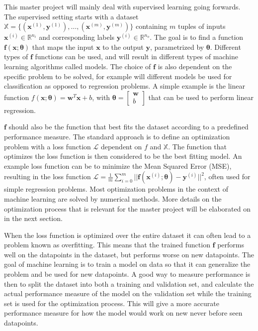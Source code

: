 \documentclass[12pt,a4paper]{book}
\begin{document}
This master project will mainly deal with supervised learning going forwards. The supervised setting starts with a dataset $\mathbb{X} = \{ (\bm{x}^{(1)}, \bm{y}^{(1)}), \dots, (\bm{x}^{(m)}, \bm{y}^{(m)}) \}$ containing $m$ tuples of inputs $\bm{x}^{(i)} \in \mathbb{R}^{n_i}$ and corresponding labels $\bm{y}^{(i)} \in \mathbb{R}^{n_o}$. The goal is to find a function $\bm{f}(\bm{x}; \bm{\theta})$ that maps the input $\bm{x}$ to the output $\bm{y}$, parametrized by $\bm{\theta}$. Different types of $\bm{f}$ functions can be used, and will result in different types of machine learning algorithms called models. The choice of $\bm{f}$ is also dependent on the specific problem to be solved, for example will different models be used for classification as opposed to regression problems. A simple example is the linear function $f(\bm{x}; \bm{\theta}) = \bm{w}^T \bm{x} + b$, with $\bm{\theta} = \begin{bmatrix}\bm{w} \\ b \end{bmatrix}$ that can be used to perform linear regression.

$\bm{f}$ should also be the function that best fits the dataset according to a predefined performance measure. The standard approach is to define an optimization problem with a loss function $\mathcal{L}$ dependent on $f$ and $\mathbb{X}$. The function that optimizes the loss function is then considered to be the best fitting model. An example loss function can be to minimize the Mean Squared Error (MSE), resulting in the loss function $\mathcal{L} = \frac{1}{m} \sum_{i=0}^{m} ||\bm{f}(\bm{x}^{(i)}; \bm{\theta}) - \bm{y}^{(i)}||^2$, often used for simple regression problems. Most optimization problems in the context of machine learning are solved by numerical methods. More details on the optimization process that is relevant for the master project will be elaborated on in the next section.

When the loss function is optimized over the entire dataset it can often lead to a problem known as overfitting. This means that the trained function $\bm{f}$ performs well on the datapoints in the dataset, but performs worse on new datapoints. The goal of machine learning is to train a model on data so that it can generalize the problem and be used for new datapoints. A good way to measure performance is then to split the dataset into both a training and validation set, and calculate the actual performance measure of the model on the validation set while the training set is used for the optimization process. This will give a more accurate performance measure for how the model would work on new never before seen datapoints.
\end{document}
